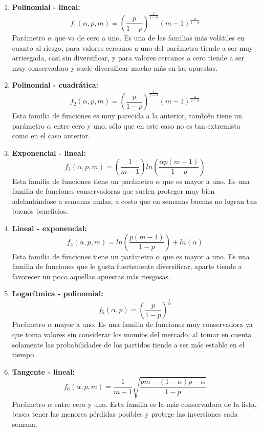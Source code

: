 \begin{enumerate}
		\item \textbf{Polinomial - lineal:} 
		\[f_1(\alpha, p, m) = \left(\frac{p}{1-p} \right)^\frac{1}{1-\alpha}(m-1)^\frac{\alpha}{1-\alpha}\]
Parámetro $\alpha$ que va de cero a uno. Es una de las familias más volátiles en cuanto al riesgo, para valores cercanos a uno del parámetro tiende a ser muy arriesgada, casi sin diversificar, y para valores cercanos a cero tiende a ser muy conservadora y suele diversificar mucho más en las apuestas.

		\item \textbf{Polinomial - cuadrática:} 
		\[f_2(\alpha, p, m) = \left(\frac{p}{1-p} \right)^\frac{1}{2-\alpha}(m-1)^\frac{\alpha}{2-\alpha}\]
Esta familia de funciones es muy parecida a la anterior, también tiene un parámetro $\alpha$ entre cero y uno, sólo que en este caso no es tan extremista como en el caso anterior.
		
		\item \textbf{Exponencial - lineal:} 
		\[f_3(\alpha, p, m) = \left(\frac{1}{m-1} \right)ln\left(\frac{\alpha p(m-1)}{1-p}\right)\]
Esta familia de funciones tiene un parámetro $\alpha$ que es mayor a uno. Es una familia de funciones conservadoras que suelen proteger muy bien adelantándose a semanas malas, a costo que en semanas buenas no logran tan buenos beneficios.
		
		\item \textbf{Lineal - exponencial:} 
		\[f_4(\alpha, p, m) = ln\left(\frac{p(m-1)}{1-p}\right) + ln(\alpha)\]
Esta familia de funciones tiene un parámetro $\alpha$ que es mayor a uno. Es una familia de funciones que le gusta fuertemente diversificar, aparte tiende a favorecer un poco aquellas apuestas más riesgosas.

		\item \textbf{Logarítmica - polinomial:} 
		\[f_5(\alpha, p) = \left(\frac{p}{1-p}\right)^\frac{1}{\alpha}\]
Parámetro $\alpha$ mayor a uno. Es una familia de funciones muy conservadora ya que toma valores sin considerar los momios del mercado, al tomar en cuenta solamente las probabilidades de los partidos tiende a ser más estable en el tiempo.

		\item \textbf{Tangente - lineal:} 
		\[f_6(\alpha, p, m) = \frac{1}{m-1}\sqrt{\frac{pm - (1-\alpha)p - \alpha}{1-p}}\]
		Parámetro $\alpha$ entre cero y uno. Esta familia es la más conservadora de la lista, busca tener las menores pérdidas posibles y protege las inversiones cada semana.
\end{enumerate}

